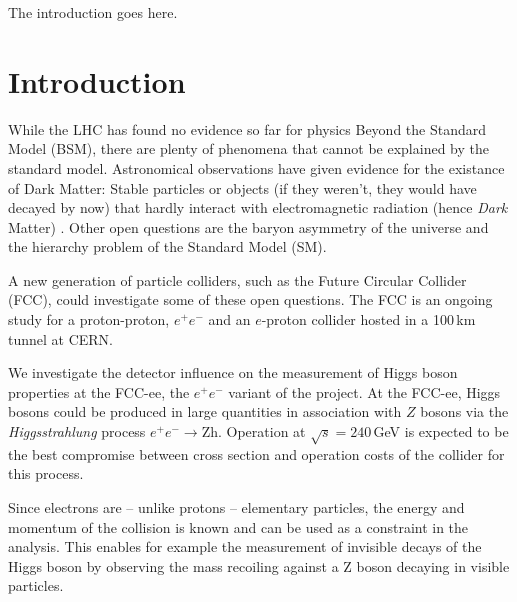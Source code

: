 The introduction goes here.

\section{Introduction}
While the LHC has found no evidence so far for physics Beyond the Standard Model (BSM), there are plenty of phenomena that cannot be explained by the standard model. Astronomical observations have given evidence for the existance of Dark Matter: Stable particles or objects (if they weren't, they would have decayed by now) that hardly interact with electromagnetic radiation (hence \emph{Dark} Matter) \cite{pdg14}. 
Other open questions are the baryon asymmetry of the universe and the hierarchy problem of the Standard Model (SM).

A new generation of particle colliders, such as the Future Circular Collider (FCC), could investigate some of these open questions. The FCC is an ongoing study for a proton-proton, $e^+ e^-$ and an $e$-proton collider hosted in a 100\,km tunnel at CERN.

We investigate the detector influence on the measurement of Higgs boson properties at the FCC-ee, the $e^+ e^-$ variant of the project.
At the FCC-ee, Higgs bosons could be produced in large quantities in association with $Z$ bosons via the \emph{Higgsstrahlung} process $e^+ e^- \rightarrow $Zh. Operation at $\sqrt{s} = 240$\,GeV is expected to be the best compromise between cross section and operation costs of the collider for this process.

Since electrons are -- unlike protons -- elementary particles, the energy and momentum of the collision is known and can be used as a constraint in the analysis. This enables for example the measurement of invisible decays of the Higgs boson by observing the mass recoiling against a Z boson decaying in visible particles.